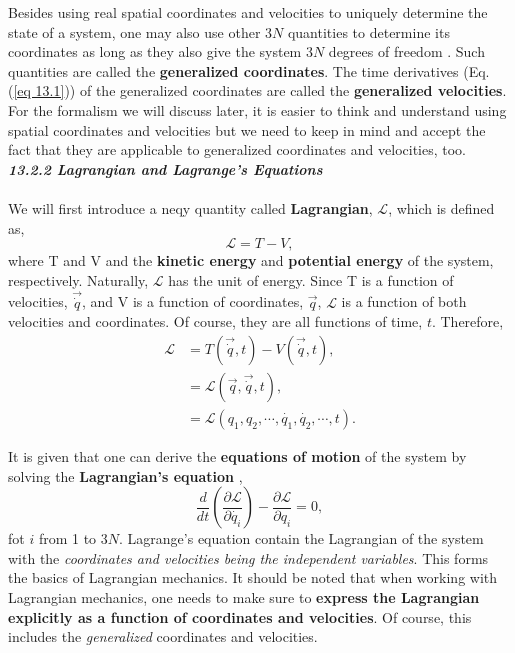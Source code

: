 \documentclass{article}
\newcommand{\bfit}[1]{\textit{\textbf{#1}}}
\begin{document}
Besides using real spatial coordinates and velocities to uniquely determine the
state of a system, one may also use other 3$N$ quantities to determine its coordinates as long as
they also give the system 3$N$ degrees of freedom \cite{Landau}. Such quantities are called
the \textbf{generalized coordinates}. The time derivatives (Eq.(\ref{eq 13.1})) of the
generalized coordinates are called the \textbf{generalized velocities}. For the formalism we will
discuss later, it is easier to think and understand using spatial coordinates and velocities but
we need to keep in mind and accept the fact that they are applicable to generalized coordinates and velocities, too.
\\[20pt]
\bfit{\large 13.2.2 Lagrangian and Lagrange's Equations}
\\\\
We will first introduce a neqy quantity called \textbf{Lagrangian}, $\mathcal{L}$, which is defined as,
\begin{equation}\label{eq 13.2}
    \mathcal{L}=T-V, \tag{13.2}
\end{equation}  
where T and V and the \textbf{kinetic energy} and \textbf{potential energy} of the system,
respectively. Naturally, $\mathcal{L}$ has the unit of energy. Since T is a function of velocities,
$\vec{\dot{q}}$, and V is a function of coordinates, $\vec{q}$, $\mathcal{L}$ is a function of both 
velocities and coordinates. Of course, they are all functions of time, $t$. Therefore,
\begin{align*}\label{eq 13.3}
    \mathcal{L}&=T(\vec{\dot{q}},t)-V(\vec{\dot{q}},t),\\
    &=\mathcal{L}(\vec{q},\vec{\dot{q}},t),\\
    &=\mathcal{L}(q_1,q_2,\cdots,\dot{q_1},\dot{q_2},\cdots,t). \tag{13.3}
\end{align*}

It is given that one can derive the \textbf{equations of motion} of the system by solving 
the \textbf{Lagrangian's equation} \cite{goldstein2001pearson},
\begin{equation}\label{eq 13.4}
    \frac{d}{dt}\left(\frac{\partial \mathcal{L}}{\partial \dot{q_i}}\right)
    -\frac{\partial \mathcal{L}}{\partial q_i}=0,\tag{13.4}
\end{equation}
fot $i$ from 1 to 3$N$. Lagrange's equation contain the Lagrangian of the system with
the \textit{coordinates and velocities being the independent variables}. This forms the basics of
Lagrangian mechanics. It should be noted that when working with Lagrangian 
mechanics, one needs to make sure to \textbf{express the Lagrangian explicitly as a
function of coordinates and velocities}. Of course, this includes the \textit{generalized} coordinates
and velocities.
\end{document}
